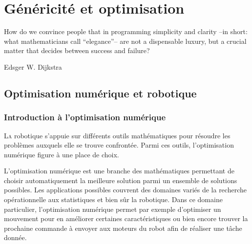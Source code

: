 \chapter{Généricité et optimisation}\label{chap:chap1}

\epigraph{\foreignlanguage{USenglish}{How do we convince people that
    in programming simplicity and clarity --in short: what
    mathematicians call ``elegance''-- are not a dispensable luxury,
    but a crucial matter that decides between success and
    failure?}}{Edsger W. Dijkstra}


\clearpage

\section{Optimisation numérique et robotique}\label{sec:chap1_optim}

\subsection{Introduction à l'optimisation numérique}\label{sec:chap1_optim_intro}

\lettrine[lines=2, lraise=0.1, nindent=0em, slope=-.5em]%
{L}{a} robotique s'appuie sur différents outils mathématiques
pour résoudre les problèmes auxquels elle se trouve confrontée. Parmi
ces outils, l'optimisation numérique figure à une place de choix.


L'optimisation numérique est une branche des mathématiques permettant
de choisir automatiquement la meilleure solution parmi un ensemble de
solutions possibles. Les applications possibles couvrent des domaines
variés de la recherche opérationnelle aux statistiques et bien sûr la
robotique. Dans ce domaine particulier, l'optimisation numérique
permet par exemple d'optimiser un mouvement pour en améliorer
certaines caractéristiques ou bien encore trouver la prochaine
commande à envoyer aux moteurs du robot afin de réaliser une tâche
donnée.



